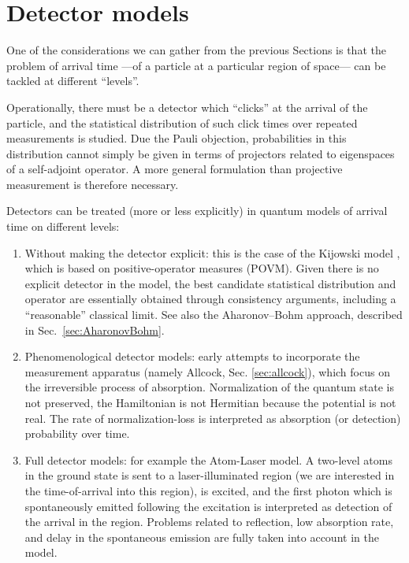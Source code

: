 \section{Detector models}\label{sec:hist:detect}

One of the considerations we can gather from the previous Sections
is that 
the problem of arrival time ---of a particle at a particular region of space---
can be tackled at different ``levels''. 

Operationally, there must be a detector which
``clicks'' at the arrival of the particle, and the statistical distribution of
such click times over repeated measurements is studied. Due the Pauli objection,
probabilities in this distribution cannot simply be given in terms of projectors related to eigenspaces of a self-adjoint operator.
A more general formulation than projective measurement is therefore necessary.

Detectors can be treated (more or less explicitly) in quantum models of arrival time on different levels:
\begin{enumerate}
  \item
    Without making the detector explicit: this is the case of the Kijowski model \parencite{Kijowski, Leavens_TOA},
    which is based on positive-operator measures (POVM). Given there is no explicit detector in the model,
    the best candidate statistical distribution and operator are essentially obtained
    through consistency arguments, including a ``reasonable'' classical limit.
    See also the Aharonov--Bohm approach, described in Sec.~\ref{sec:AharonovBohm}.
  \item
    Phenomenological detector models:
    early attempts to incorporate the measurement apparatus
    (namely Allcock, Sec. \ref{sec:allcock}), which
    focus on the irreversible process of absorption.
    Normalization of the quantum state is not preserved, the Hamiltonian is not Hermitian
    because the potential is not real. The rate of normalization-loss is interpreted as
    absorption (or detection) probability over time.
  \item
    Full detector models: for example the Atom-Laser model. A two-level atoms in the ground state
    is sent to a laser-illuminated region (we are interested in the time-of-arrival into this region),
    is excited, and the first photon which is spontaneously emitted following the excitation
    is interpreted as detection of the arrival in the region. Problems related to
    reflection, low absorption rate, and delay in the spontaneous emission are fully taken into account in the model.
\end{enumerate}

